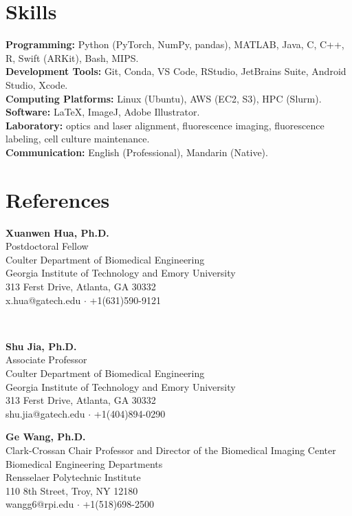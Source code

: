 \documentclass[letterpaper, 11pt]{article}
\newcommand{\subsectionvspace}{\vspace{8pt}}
\begin{document}
\section{Skills}


    \textbf{Programming:} Python (PyTorch, NumPy, pandas), MATLAB, Java, C, C++, R, Swift (ARKit), Bash, MIPS. \\
    \textbf{Development Tools:} Git, Conda, VS Code, RStudio, JetBrains Suite, Android Studio, Xcode. \\
    \textbf{Computing Platforms:} Linux (Ubuntu), AWS (EC2, S3), HPC (Slurm). \\
    \textbf{Software:} LaTeX, ImageJ, Adobe Illustrator. \\
    \textbf{Laboratory:} optics and laser alignment, fluorescence imaging, fluorescence labeling, cell culture maintenance. \\
    \textbf{Communication:} English (Professional), Mandarin (Native).


\section{References}


    \begin{minipage}[t]{0.48\textwidth} 
        \textbf{Xuanwen Hua, Ph.D.} \\
        Postdoctoral Fellow \\
        Coulter Department of Biomedical Engineering \\
        Georgia Institute of Technology and Emory University \\
        313 Ferst Drive, Atlanta, GA 30332 \\
        x.hua@gatech.edu $\cdot$ +1(631)590-9121
    \end{minipage}%
    \begin{minipage}[t]{0.04\textwidth}
        \
    \end{minipage}%
    \begin{minipage}[t]{0.48\textwidth}
        \textbf{Shu Jia, Ph.D.} \\
        Associate Professor \\
        Coulter Department of Biomedical Engineering \\
        Georgia Institute of Technology and Emory University \\
        313 Ferst Drive, Atlanta, GA 30332 \\
        shu.jia@gatech.edu $\cdot$ +1(404)894-0290
    \end{minipage}

    \subsectionvspace

    \textbf{Ge Wang, Ph.D.} \\
    Clark-Crossan Chair Professor and Director of the Biomedical Imaging Center \\
    Biomedical Engineering Departments \\
    Rensselaer Polytechnic Institute \\
    110 8th Street, Troy, NY 12180 \\
    wangg6@rpi.edu $\cdot$ +1(518)698-2500
\end{document}
